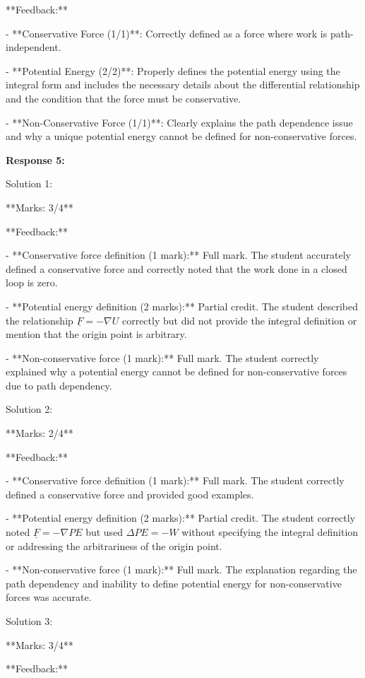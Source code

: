 \documentclass[a4paper,11pt]{article}
\begin{document}
**Feedback:**

- **Conservative Force (1/1)**: Correctly defined as a force where work is path-independent.

- **Potential Energy (2/2)**: Properly defines the potential energy using the integral form and includes the necessary details about the differential relationship and the condition that the force must be conservative.

- **Non-Conservative Force (1/1)**: Clearly explains the path dependence issue and why a unique potential energy cannot be defined for non-conservative forces.

\bigskip
\textbf{Response 5:}

Solution 1:

**Marks: 3/4**

**Feedback:**

- **Conservative force definition (1 mark):** Full mark. The student accurately defined a conservative force and correctly noted that the work done in a closed loop is zero.

- **Potential energy definition (2 marks):** Partial credit. The student described the relationship \( \underline{F} = -\nabla U \) correctly but did not provide the integral definition or mention that the origin point is arbitrary.

- **Non-conservative force (1 mark):** Full mark. The student correctly explained why a potential energy cannot be defined for non-conservative forces due to path dependency.

Solution 2:

**Marks: 2/4**

**Feedback:**

- **Conservative force definition (1 mark):** Full mark. The student correctly defined a conservative force and provided good examples.

- **Potential energy definition (2 marks):** Partial credit. The student correctly noted \( \underline{F} = -\nabla PE \) but used \(\Delta PE = -W\) without specifying the integral definition or addressing the arbitrariness of the origin point.

- **Non-conservative force (1 mark):** Full mark. The explanation regarding the path dependency and inability to define potential energy for non-conservative forces was accurate.

Solution 3:

**Marks: 3/4**

**Feedback:**
\end{document}
